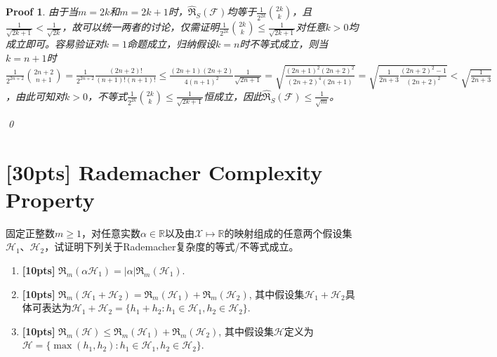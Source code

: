 \documentclass[a4paper,UTF8]{article}
\numberwithin{equation}{section}
\newtheorem*{myProof}{Proof}
\begin{document}
\begin{myProof}
由于当$m=2k$和$m=2k+1$时，$\hat{\mathfrak{R}}_S(\mathcal{F})$均等于$\frac{1}{2^{2k}}\binom{2k}{k}$，且$\frac{1}{\sqrt{2k + 1}} < \frac{1}{\sqrt{2k}}$，故可以统一两者的讨论，仅需证明$\frac{1}{2^{2k}}\binom{2k}{k} \le \frac{1}{\sqrt{2k+1}}$对任意$k > 0$均成立即可。容易验证对$k=1$命题成立，归纳假设$k=n$时不等式成立，则当$k=n+1$时$\frac{1}{2^{2n+2}} \binom{2n+2}{n+1} = \frac{1}{2^{2n+2}} \frac{(2n+2)!}{(n+1)!(n+1)!} \le \frac{(2n+1)(2n+2)}{4(n+1)^2} \frac{1}{\sqrt{2n+1}} = \sqrt{\frac{(2n+1)^2(2n+2)^2}{(2n+2)^4(2n+1)}} = \sqrt{\frac{1}{2n+3} \frac{(2n+2)^2 - 1}{(2n+2)^2}} < \sqrt{\frac{1}{2n+3}} $，由此可知对$k>0$，不等式$\frac{1}{2^{2k}}\binom{2k}{k} \le \frac{1}{\sqrt{2k+1}}$恒成立，因此$\hat{\mathfrak{R}}_S(\mathcal{F}) \le \frac{1}{\sqrt{m}}$。

\qed
\end{myProof}
\newpage

\section{[30pts] Rademacher Complexity Property}
固定正整数$m\geq 1$，对任意实数$\alpha\in \mathbb R$以及由$\mathcal{X} \mapsto \mathbb R$的映射组成的任意两个假设集$\mathcal{H}_1$、$\mathcal{H}_2$，试证明下列关于Rademacher复杂度的等式/不等式成立。
\begin{enumerate}[ {(}1{)}]
\item \textbf{[10pts]} $\mathfrak{R}_m(\alpha \mathcal{H}_1) = |\alpha|\mathfrak{R}_m(\mathcal{H}_1)$.
\item \textbf{[10pts]} $\mathfrak{R}_m(\mathcal{H}_1 + \mathcal{H}_2) = \mathfrak{R}_m(\mathcal{H}_1) + \mathfrak{R}_m(\mathcal{H}_2)$, 其中假设集$\mathcal{H}_1 + \mathcal{H}_2$具体可表达为$\mathcal{H}_1 + \mathcal{H}_2 = \{h_1 + h_2: h_1\in \mathcal{H}_1, h_2\in \mathcal{H}_2\}$.
\item \textbf{[10pts]} $\mathfrak{R}_m(\mathcal{H}) \leq \mathfrak{R}_m(\mathcal{H}_1) + \mathfrak{R}_m(\mathcal{H}_2)$, 其中假设集$\mathcal{H}$定义为$\mathcal{H} = \{\max(h_1,h_2): h_1\in \mathcal{H}_1, h_2\in \mathcal{H}_2\}$.
\end{enumerate}
\end{document}
